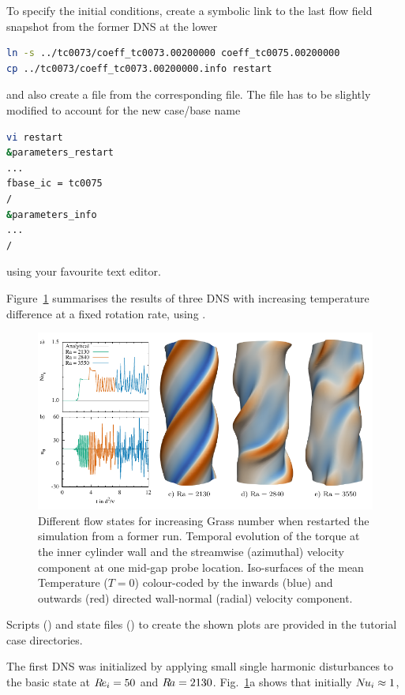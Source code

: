 \documentclass[a4paper, 11pt, DIV=11]{scrartcl}
\begin{document}
To specify the initial conditions, create a symbolic link to the last flow field snapshot
from the former DNS at the lower \Gr
\begin{lstlisting}[language=bash]
ln -s ../tc0073/coeff_tc0073.00200000 coeff_tc0075.00200000
cp ../tc0073/coeff_tc0073.00200000.info restart
\end{lstlisting}
and also create a file  from the corresponding  file.
The file  has to be slightly modified to account for the new case/base
name
\begin{lstlisting}[language=bash]
vi restart
&parameters_restart
...
fbase_ic = tc0075
/
&parameters_info
...
/
\end{lstlisting}
using your favourite text editor.
\par
Figure~\ref{fig:compareGrass} summarises the results of three DNS with increasing
temperature difference at a fixed rotation rate, using \nsc.
\begin{figure}[htb]
\centering
\includegraphics[width=1.00\textwidth]{figures/compareGr.pdf}
\caption{Different flow states for increasing Grass number when restarted
the simulation from a former run. Temporal evolution of the torque at the inner
cylinder wall and the streamwise (azimuthal) velocity component at one mid-gap
probe location. Iso-surfaces of the mean Temperature ($T=0$) colour-coded by the
inwards (blue) and outwards (red) directed wall-normal (radial) velocity component.}
\label{fig:compareGrass}
\end{figure}
Scripts (\gnuplot) and state files (\paraview) to create the shown plots
are provided in the tutorial case directories.
\par
The first DNS was initialized by applying small single harmonic disturbances to
the basic state at $R\hspace{-0.1em}e_{i}=\num{50}$ and $R\hspace{-0.1em}a=\num{2130}$.
Fig.~\ref{fig:compareGrass}a shows that initially $N\hspace{-0.1em}u_{i}\approx\num{1}$,
\end{document}
